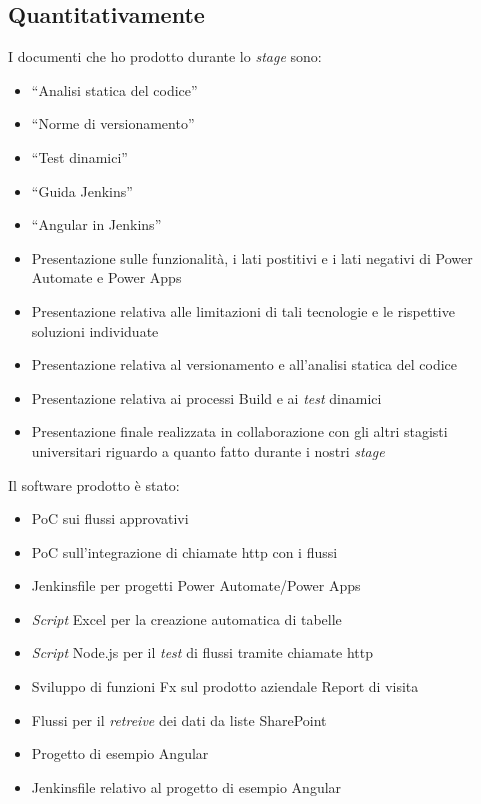 \subsection{Quantitativamente}
I documenti che ho prodotto durante lo \emph{stage} sono:
\begin{itemize}
    \item “Analisi statica del codice” 
    \item “Norme di versionamento” 
    \item “Test dinamici”
    \item “Guida Jenkins” 
    \item “Angular in Jenkins” 
    \item Presentazione sulle funzionalità, i lati postitivi e i lati negativi di Power Automate e Power Apps 
    \item Presentazione relativa alle limitazioni di tali tecnologie e le rispettive soluzioni individuate 
    \item Presentazione relativa al versionamento e all'analisi statica del codice 
    \item Presentazione relativa ai processi Build e ai \emph{test} dinamici 
    \item Presentazione finale realizzata in collaborazione con gli altri stagisti universitari riguardo a quanto fatto durante i nostri \emph{stage} 
\end{itemize}
 
\noindent Il software prodotto è stato: 
\begin{itemize}
    \item PoC sui flussi approvativi 
    \item PoC sull'integrazione di chiamate \gls{http} con i flussi  
    \item Jenkinsfile per progetti Power Automate/Power Apps 
    \item \emph{Script} Excel per la creazione automatica di tabelle 
    \item \emph{Script} Node.js per il \emph{test} di flussi tramite chiamate \gls{http} 
    \item Sviluppo di funzioni Fx sul prodotto aziendale Report di visita 
    \item Flussi per il \emph{retreive} dei dati da liste SharePoint 
    \item Progetto di esempio Angular 
    \item Jenkinsfile relativo al progetto di esempio Angular 
\end{itemize}
